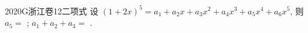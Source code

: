 
\begin{problem}{2020}{G}{浙江卷}{12}{二项式}
设 $ (1+2x)^5=a_1+a_2x+a_3x^2+a_4x^3+a_5x^4+a_6x^5 $, 则 $ a_5= $ \underline{\hspace{4em}};  
$ a_1+a_2+a_3= $ \underline{\hspace{4em}}.
\end{problem}

\begin{answer}

\end{answer}

\begin{solutions}

\end{solutions}